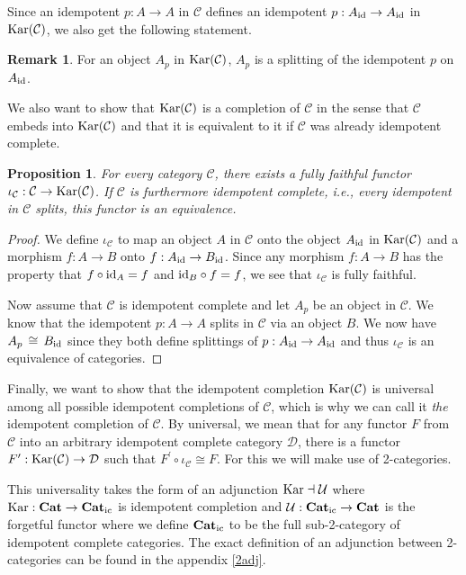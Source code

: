 \documentclass[12pt,oneside,reqno,a4paper]{article}
\newtheorem{proposition}[theorem]{Proposition}
\theoremstyle{definition}
\newtheorem{remark}[theorem]{Remark}
\newcommand{\Cat}{\textbf{\textup{Cat}}}
\newcommand{\Catic}{\textbf{\textup{Cat}}_\textup{ic}}
\newcommand{\Kar}[1]{\textup{Kar}(#1)}
\newcommand{\Kartwo}{\textup{Kar}}
\newcommand{\iso}{\,\cong\,}
\newcommand{\id}{\textup{id}}
\newcommand{\C}{\mathcal{C}}
\newcommand{\D}{\mathcal{D}}
\newcommand{\U}{\mathcal{U}}
\newcommand{\p}{^\prime}
\begin{document}
Since an idempotent $p:A\to A$ in $\C$ defines an idempotent $p:A_{\id}\to A_{\id}$ in $\Kar{\C}$, we also get the following statement.

\begin{remark}\label{eobsplit}
For an object $A_p$ in $\Kar{\C}$, $A_p$ is a splitting of the idempotent $p$ on $A_{\id}$.
\end{remark}

We also want to show that $\Kar{\C}$ is a completion of $\C$ in the sense that $\C$ embeds into $\Kar{\C}$ and that it is equivalent to it if $\C$ was already idempotent complete.

\begin{proposition} \label{kar1emb}
For every category $\C$, there exists a fully faithful functor $\iota_\C:\C\to\Kar{\C}$. If $\C$ is furthermore idempotent complete, i.e., every idempotent in $\C$ splits, this functor is an equivalence.
\end{proposition}

\begin{proof}
We define $\iota_\C$ to map an object $A$ in $\C$ onto the object $A_{\id}$ in $\Kar{\C}$ and a morphism $f:A\to B$ onto $f:A_{\id}\to B_{\id}$. Since any morphism $f:A\to B$ has the property that $f\circ \id_A=f$ and $\id_B\circ f=f$, we see that $\iota_\C$ is fully faithful.

Now assume that $\C$ is idempotent complete and let $A_p$ be an object in $\C$. We know that the idempotent $p:A\to A$ splits in $\C$ via an object $B$. We now have $A_p\iso B_{\id}$ since they both define splittings of $p:A_{\id}\to A_{\id}$ and thus $\iota_\C$ is an equivalence of categories.
\end{proof}

Finally, we want to show that the idempotent completion $\Kar{\C}$ is universal among all possible idempotent completions of $\C$, which is why we can call it \textit{the} idempotent completion of $\C$. By universal, we mean that for any functor $F$ from $\C$ into an arbitrary idempotent complete category $\D$, there is a functor $F\p:\Kar{\C}\to \D$ such that $F^\prime\circ \iota_\C\cong F$. For this we will make use of 2-categories.

This universality takes the form of an adjunction $\Kartwo\dashv \U$ where $\Kartwo:\Cat\to\Catic$ is idempotent completion and $\U:\Catic\to\Cat$ is the forgetful functor where we define $\Catic$ to be the full sub-2-category of idempotent complete categories. The exact definition of an adjunction between 2-categories can be found in the appendix \ref{2adj}.
\end{document}
